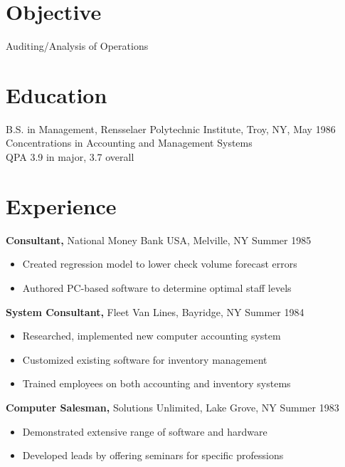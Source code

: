  
\begin{resume} 
 
\section{Objective} 
Auditing/Analysis of Operations 

\section{Education} 
B.S. in Management, Rensselaer Polytechnic Institute, Troy, NY, May 1986 \\
Concentrations in Accounting and Management Systems \\
QPA 3.9 in major, 3.7 overall
 

\section{Experience}
 {\bf Consultant,} National Money Bank USA, Melville, NY \hfill Summer  1985
 \begin{itemize} \itemsep -2pt  %
 \item Created regression model to lower check volume 
                 forecast errors
 \item Authored PC-based software to determine optimal 
                 staff levels 
 \end{itemize}

 
 
{\bf System Consultant,} Fleet Van Lines, Bayridge, NY \hfill  Summer 1984
\begin{itemize} \itemsep -2pt %
\item Researched, implemented new computer accounting 
                 system 
\item Customized existing software for inventory 
                 management 
\item Trained employees on both accounting and inventory 
                 systems 
\end{itemize}

{\bf Computer Salesman,} Solutions Unlimited, Lake Grove, NY \hfill
Summer 1983                
                \begin{itemize} \itemsep -2pt
                 \item  Demonstrated extensive range of software and 
                 hardware 
                
                 \item Developed leads by offering seminars for specific 
                 professions 


\end{itemize}
\end{resume}
